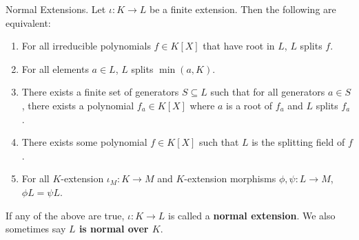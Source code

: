 \documentclass[../book.tex]{subfiles}
\begin{document}
\begin{dfn} Normal Extensions. 
    Let $\iota : K \to L$ be a finite extension. 
    Then the following are equivalent: 
    \begin{enumerate}
        \item For all irreducible polynomials $f \in K[X]$ that have root in $L$,
        $L$ splits $f$. 
        \item For all elements $a \in L$, $L$ splits $\min(a,K)$. 
        \item There exists a finite set of generators $S \subseteq L$ such that
        for all generators $a\in S$, there exists a polynomial $f_a \in K[X]$
        where $a$ is a root of $f_a$ and $L$ splits $f_a$.
        \item There exists some polynomial $f \in K[X]$ such that 
        $L$ is the splitting field of $f$. 
        \item For all $K$-extension $\iota_M : K \to M$ and 
        $K$-extension morphisms $\phi, \psi : L \to M$, $\phi L = \psi L$. 
    \end{enumerate}
    If any of the above are true, 
    $\iota : K \to L$ is called a \textbf{normal extension}.
    We also sometimes say \textbf{$L$ is normal over $K$}. 
\end{dfn}
\end{document}
